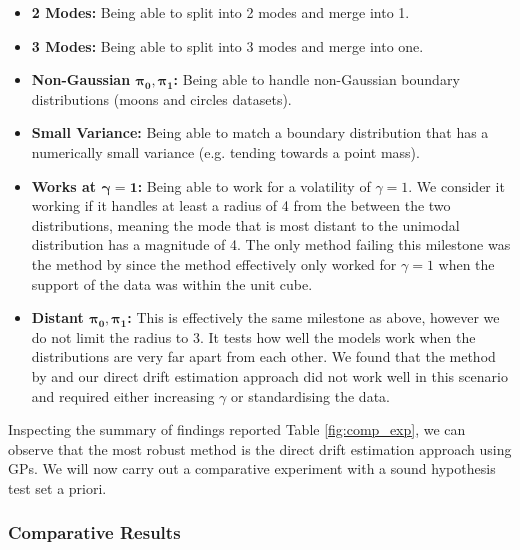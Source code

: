 \documentclass[a4paper,12pt,twoside,openright]{report}
\theoremstyle{definition}
\begin{document}
\begin{itemize}
    \item \textbf{ 2 Modes:} Being able to split into 2 modes and merge into 1.
    \item \textbf{ 3 Modes:} Being able to split into 3 modes and merge into one.
    \item \textbf{Non-Gaussian $\bm{\pi_0,\pi_1}$:} Being able to handle non-Gaussian boundary distributions (moons and circles datasets). 
    \item \textbf{Small Variance:} Being able to match a boundary distribution that has a numerically small variance (e.g. tending towards a point mass).  
    \item \textbf{Works at $\bm{\gamma=1}$:} Being able to work for a volatility of $\gamma=1$. We consider it working if it handles at least  a radius of 4 from the between the two distributions, meaning the mode that is most distant to the unimodal distribution has a magnitude of 4. The only method failing this milestone was the method by \cite{pavon2018data} since the method effectively only worked for $\gamma=1$ when the support of the data was within the unit cube.
    \item \textbf{Distant $\bm{\pi_0, \pi_1}$:} This is effectively the same milestone as above, however we do not limit the radius to 3. It tests how well the models work when the distributions are very far apart from each other. We found that the method by \cite{pavon2018data} and our direct drift estimation approach did not work well in this scenario and required either increasing $\gamma$ or standardising the data.
\end{itemize}

Inspecting the summary of findings reported Table \ref{fig:comp_exp}, we can observe that the most robust method is the direct drift estimation approach using GPs. We will now carry out a comparative experiment with a sound hypothesis test set a priori. 

\subsubsection{Comparative Results}
\end{document}
